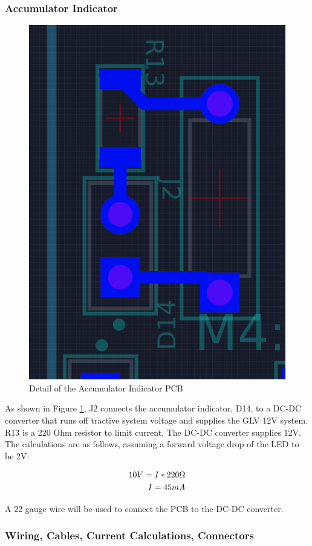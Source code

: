 \documentclass{article}
\begin{document}
        \subsubsection{Accumulator Indicator} \label{aindicator}
        
            
            \begin{figure}[H]
            \centering
            \includegraphics[width = 0.3 \textwidth]{ai}
            \caption{Detail of the Accumulator Indicator PCB}
            \label{indicator}
            \end{figure}
            
            As shown in Figure \ref{indicator}, J2 connects the accumulator indicator, D14, to a DC-DC converter that runs off tractive system voltage and supplies the GLV 12V system. R13 is a 220 Ohm resistor to limit current. The DC-DC converter supplies 12V. The calculations are as follows, assuming a forward voltage drop of the LED to be 2V:
            
            \begin{align}
                10 V = I * 220 \ohm \\
                I = 45 mA
            \end{align}
            
            A 22 gauge wire will be used to connect the PCB to the DC-DC converter.
            
        \subsubsection{Wiring, Cables, Current Calculations, Connectors} \label{batteryconnectors}
            
\end{document}
